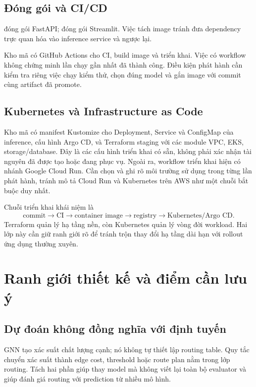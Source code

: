 \documentclass[12pt,a4paper]{article}
\begin{document}
\subsection{Đóng gói và CI/CD}

 đóng gói FastAPI;  đóng gói Streamlit. Việc tách image tránh đưa dependency trực quan hóa vào inference service và ngược lại.

Kho mã có GitHub Actions cho CI, build image và triển khai. Việc có workflow không chứng minh lần chạy gần nhất đã thành công. Điều kiện phát hành cần kiểm tra riêng việc chạy kiểm thử, chọn đúng model và gắn image với commit cùng artifact đã promote.

\subsection{Kubernetes và Infrastructure as Code}

Kho mã có manifest Kustomize cho Deployment, Service và ConfigMap của inference, cấu hình Argo CD, và Terraform staging với các module VPC, EKS, storage/database. Đây là các cấu hình triển khai có sẵn, không phải xác nhận tài nguyên đã được tạo hoặc đang phục vụ. Ngoài ra, workflow triển khai hiện có nhánh Google Cloud Run. Cần chọn và ghi rõ môi trường sử dụng trong từng lần phát hành, tránh mô tả Cloud Run và Kubernetes trên AWS như một chuỗi bắt buộc duy nhất.

Chuỗi triển khai khái niệm là
\[
  \text{commit}
  \rightarrow \text{CI}
  \rightarrow \text{container image}
  \rightarrow \text{registry}
  \rightarrow \text{Kubernetes/Argo CD}.
\]
Terraform quản lý hạ tầng nền, còn Kubernetes quản lý vòng đời workload. Hai lớp này cần giữ ranh giới rõ để tránh trộn thay đổi hạ tầng dài hạn với rollout ứng dụng thường xuyên.

\section{Ranh giới thiết kế và điểm cần lưu ý}
\label{sec:boundaries}

\subsection{Dự đoán không đồng nghĩa với định tuyến}

GNN tạo xác suất chất lượng cạnh; nó không tự thiết lập routing table. Quy tắc chuyển xác suất thành edge cost, threshold hoặc route plan nằm trong lớp routing. Tách hai phần giúp thay model mà không viết lại toàn bộ evaluator và giúp đánh giá routing với prediction từ nhiều mô hình.
\end{document}
